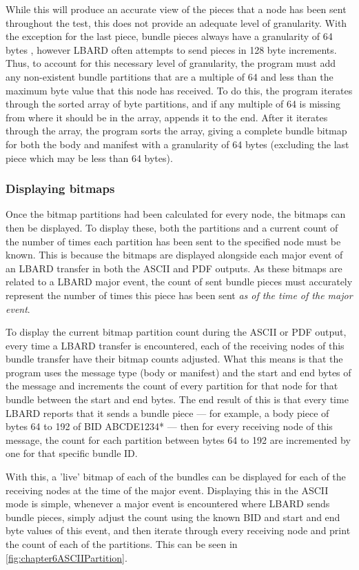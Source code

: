 While this will produce an accurate view of the pieces that a node has been sent throughout the test, this does not provide an adequate level of granularity.
With the exception for the last piece, bundle pieces always have a granularity of 64 bytes , however LBARD often attempts to send pieces in 128 byte increments. 
Thus, to account for this necessary level of granularity, the program must add any non-existent bundle partitions that are a multiple of 64 and less than the maximum byte value that this node has received.
To do this, the program iterates through the sorted array of byte partitions, and if any multiple of 64 is missing from where it should be in the array, appends it to the end.
After it iterates through the array, the program sorts the array, giving a complete bundle bitmap for both the body and manifest with a granularity of 64 bytes (excluding the last piece which may be less than 64 bytes).


\subsubsection{Displaying bitmaps}
Once the bitmap partitions had been calculated for every node, the bitmaps can then be displayed.
To display these, both the partitions and a current count of the number of times each partition has been sent to the specified node must be known.
This is because the bitmaps are displayed alongside each major event of an LBARD transfer in both the ASCII and PDF outputs. 
As these bitmaps are related to a LBARD major event, the count of sent bundle pieces must accurately represent the number of times this piece has been sent \emph{as of the time of the major event}.

To display the current bitmap partition count during the ASCII or PDF output, every time a LBARD transfer is encountered, each of the receiving nodes of this bundle transfer have their bitmap counts adjusted.
What this means is that the program uses the message type (body or manifest) and the start and end bytes of the message and increments the count of every partition for that node for that bundle between the start and end bytes.
The end result of this is that every time LBARD reports that it sends a bundle piece — for example, a body piece of bytes 64 to 192 of BID ABCDE1234* — then for every receiving node of this message, the count for each partition between bytes 64 to 192 are incremented by one for that specific bundle ID.

With this, a 'live' bitmap of each of the bundles can be displayed for each of the receiving nodes at the time of the major event.
Displaying this in the ASCII mode is simple, whenever a major event is encountered where LBARD sends bundle pieces, simply adjust the count using the known BID and start and end byte values of this event, and then iterate through every receiving node and print the count of each of the partitions. 
This can be seen in \figurename{ \ref{fig:chapter6ASCIIPartition}}.

